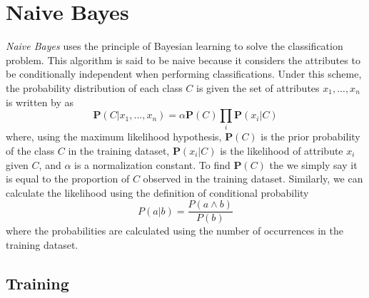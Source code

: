 \documentclass{article}
\newcommand{\ve}[1]{\boldsymbol{\mathbf{#1}}}
\begin{document}
\section{Naive Bayes}
	\label{nbw}

	\textit{Naive Bayes} uses the principle of Bayesian learning to solve the classification problem. 
	This algorithm is said to be naive because it considers the attributes to be conditionally independent when performing classifications. 
	Under this scheme, the probability distribution of each class $C$ is given the set of attributes $x_1,...,x_n$ is written by \cite{ai} as
	\begin{equation}					
		\ve{P}(C|x_1,...,x_n) = \alpha \ve{P}(C) \prod_i \ve{P}(x_i| C)
		\label{nb_pd}
	\end{equation}	
	where, using the maximum likelihood hypothesis, $\ve{P}(C)$ is the prior probability of the class $C$ in the training dataset, $\ve{P}(x_i|C)$ is the likelihood of attribute $x_i$ given $C$, and $\alpha$ is a normalization constant. 
	To find $\ve{P}(C)$ the we simply say it is equal to the proportion of $C$ observed in the training dataset. 
	Similarly, we can calculate the likelihood using the definition of conditional probability
	\begin{equation*}
		P(a|b) = \frac{P(a \land b)}{P(b)}
	\end{equation*}
	where the probabilities are calculated using the number of occurrences in the training dataset. 

	\subsection{Training}
		\label{nb_train}
		
\end{document}
